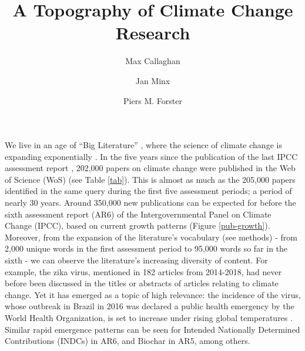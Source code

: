 \documentclass{article}
\title{A Topography of Climate Change Research}
\author[1,2]{Max Callaghan}
\author[1,2]{Jan Minx}
\author[2]{Piers M. Forster}
\affil[1]{Mercator Research Institute on Global Commons and Climate Change, Torgauer Straße, 10829 Berlin, Germany}
\affil[2]{Priestley International Centre for Climate, University of Leeds, Leeds LS2 9JT, United Kingdom}
\makeatletter
\renewcommand{\maketitle}{\bgroup\setlength{\parindent}{0pt}
	\begin{flushleft}
		
		{\huge\textbf{\@title}}
		
		\bigskip
		
		{\large\textbf{\@author}}
		
	\end{flushleft}\egroup
}
\makeatother
\begin{document}
	\maketitle
	
	
	\begin{linenumbers}
		
		\noindent\textbf{}
		
		
		
		\bigskip
		
		\noindent We live in an age of ``Big Literature'' 
		\cite{Nunez-Mir2016, Minx2017l}, where the science of climate change is expanding exponentially \cite{Grieneisen2011, Haunschild2016}. In the five years since the publication of the last IPCC assessment report \cite{IPCC2014c}, 202,000 papers on climate change were published in the Web of Science (WoS) (see Table \ref{tab}). This is almost as much as the 205,000 papers identified in the same query \cite{Grieneisen2011} during the first five assessment periods; a period of nearly 30 years. Around 350,000 new publications can be expected for before the sixth assessment report (AR6) of the Intergovernmental Panel on Climate Change (IPCC), based on current growth patterns (Figure \ref{pub-growth}). Moreover, from the expansion of the literature's vocabulary (see methods) - from 2,000 unique words in the first assessment period to 95,000 words so far in the sixth - we can observe the literature's increasing diversity of content. For example, the zika virus, mentioned in 182 articles from 2014-2018, had never before been discussed in the titles or abstracts of articles relating to climate change. Yet it has emerged as a topic of high relevance: the incidence of the virus, whose outbreak in Brazil in 2016 was declared a public health emergency by the World Health Organization, is set to increase under rising global temperatures \cite{Rao2019}. Similar rapid emergence patterns can be seen for Intended Nationally Determined Contributions (INDCs) in AR6, and Biochar in AR5, among others.
		

\end{linenumbers}
\end{document}

